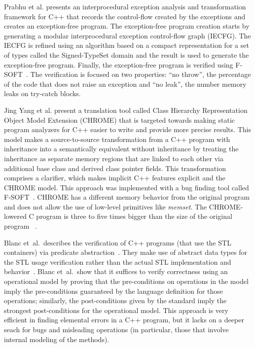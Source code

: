 \documentclass[a4paper]{llncs}
\begin{document}
Prabhu et al. presents an interprocedural exception
analysis and transformation framework for C++ that
records the control-flow created by the exceptions
and creates an exception-free program. The exception-free
program creation starts by generating a modular interprocedural
exception control-flow graph (IECFG). The IECFG is refined using
an algorithm based on a compact representation for a set of types
called the Signed-TypeSet domain and the result is used
to generate the exception-free program. Finally, the exception-free
program is verified using F-SOFT~\cite{Fsoft}. The verification is
focused on two properties: ``no throw'', the percentage of the code
that does not raise an exception and ``no leak'', the number memory
leaks on try-catch blocks.~\cite{PrabhuMBIG11}

Jing Yang et al. present a translation tool called Class Hierarchy
Representation Object Model Extension (CHROME) that is targeted towards
making static program analyzers for C++ easier to write and provide
more precise results. This model makes a source-to-source transformation
from a C++ program with inheritance into a semantically equivalent without
inheritance by treating the inheritance as separate memory regions
that are linked to each other via additional base class and derived class
pointer fields. This transformation comprises a clarifier, which makes
implicit C++ features explicit and the CHROME model. This approach was
implemented with a bug finding tool called F-SOFT~\cite{Fsoft}. CHROME has a
different memory behavior from the original program and does not allow the use
of low-level primitives like \textit{memset}. The CHROME-lowered C program is
three to five times bigger than the size of the original program ~\cite{Yang12}.

Blanc et~al.\ describes the verification of C++ programs (that use the STL containers)
via predicate abstraction~\cite{Blanc07}. They make use of abstract data types for the STL
usage verification rather than the actual STL implementation and behavior~\cite{Blanc07}.
Blanc et~al.\ show that it suffices to verify correctness using an operational model
by proving that the pre-conditions on operations in the model imply the pre-conditions
guaranteed by the language definition for those operations; similarly, the post-conditions
given by the standard imply the strongest post-conditions for the operational model.
This approach is very efficient in finding elemental errors in a C++ program, but it lacks
on a deeper seach for bugs and misleading operations (in particular, those that involve internal
modeling of the methods).
\end{document}
